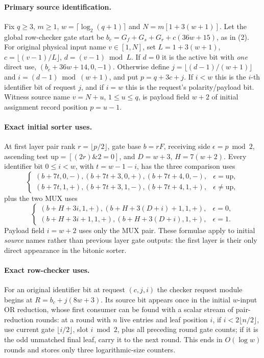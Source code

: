 \documentclass[11pt]{article}
\begin{document}
\paragraph{Primary source identification.}
Fix $q\ge3$, $m\ge1$, $w=\lceil\log_2(q+1)\rceil$ and
$N=m[1+3(w+1)]$. Let the global row-checker gate start be
$b_c=G_f+G_s+G_r+c(36w+15)$, as in (2).
For original physical input name $v\in[1,N]$, set
$L=1+3(w+1)$, $c=\lfloor(v-1)/L\rfloor$, $d=(v-1)\bmod L$.
If $d=0$ it is the active bit with \emph{one} direct use,
$(b_c+36w+14,0,-1)$.
Otherwise define $j=\lfloor(d-1)/(w+1)\rfloor$ and
$i=(d-1)\bmod(w+1)$, and put $p=q+3c+j$.
If $i<w$ this is the $i$-th identifier bit of request $j$,
and if $i=w$ this is the request's polarity/payload bit.
Witness source name $v=N+u$, $1\le u\le q$, is payload field $w+2$
of initial assignment record position $p=u-1$.

\paragraph{Exact initial sorter uses.}
At first layer pair rank $r=\lfloor p/2\rfloor$, gate base
$b=rF$, receiving side $\epsilon=p\bmod2$, ascending test
$\mathrm{up}=[(2r)\mathbin{\&}2=0]$, and $D=w+3$, $H=7(w+2)$.
Every identifier bit $0\le i<w$, with $t=w-1-i$, has the three
comparison uses
\[
\begin{cases}
(b+7t,0,-),(b+7t+3,0,+),(b+7t+4,0,-),&\epsilon=\mathrm{up},\\
(b+7t,1,+),(b+7t+3,1,-),(b+7t+4,1,+),&\epsilon\ne\mathrm{up},
\end{cases}
\]
plus the two MUX uses
\[
\begin{cases}
(b+H+3i,1,+),(b+H+3(D+i)+1,1,+),&\epsilon=0,\\
(b+H+3i+1,1,+),(b+H+3(D+i),1,+),&\epsilon=1.
\end{cases}
\]
Payload field $i=w+2$ uses only the MUX pair. These
formulae apply to initial \emph{source} names rather than
previous layer gate outputs: the first layer is their only
direct appearance in the bitonic sorter.

\paragraph{Exact row-checker uses.}
For an original identifier bit at request $(c,j,i)$ the checker
request module begins at $R=b_c+j(8w+3)$.
Its source bit appears once in the initial $w$-input OR
reduction, whose first consumer can be found with a scalar
stream of pair-reduction rounds:
at a round with $n$ live entries and leaf position $i$,
if $i<2\lfloor n/2\rfloor$, use current gate
$\lfloor i/2\rfloor$, slot $i\bmod2$, plus all preceding
round gate counts; if it is the odd unmatched final leaf,
carry it to the next round. This ends in $O(\log w)$ rounds
and stores only three logarithmic-size counters.
\end{document}
